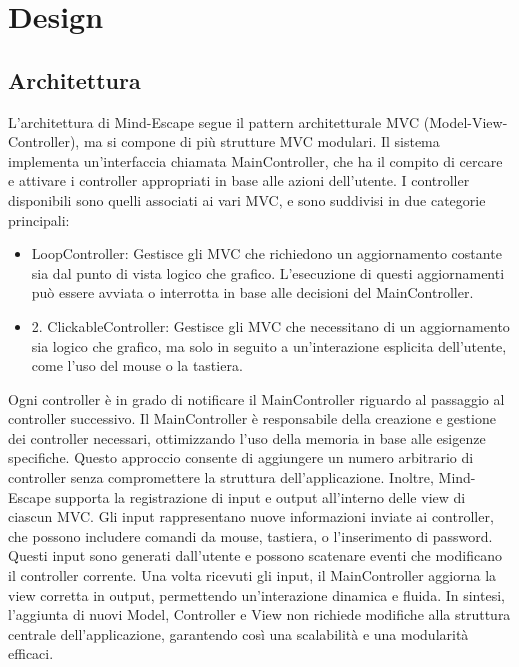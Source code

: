 \documentclass[a4paper,12pt]{report}
\begin{document}
\chapter{Design}
\section{Architettura}
L'architettura di Mind-Escape segue il pattern architetturale MVC (Model-View-Controller), ma si compone di più strutture MVC modulari. 
Il sistema implementa un'interfaccia chiamata MainController, che ha il compito di cercare e attivare i controller appropriati in base alle azioni dell'utente. 
I controller disponibili sono quelli associati ai vari MVC, e sono suddivisi in due categorie principali:
\begin{itemize}
	\item LoopController: Gestisce gli MVC che richiedono un aggiornamento costante sia dal punto di vista logico che grafico. L'esecuzione di questi aggiornamenti può essere avviata o interrotta in base alle decisioni del MainController.
	\item 2.	ClickableController: Gestisce gli MVC che necessitano di un aggiornamento sia logico che grafico, ma solo in seguito a un'interazione esplicita dell'utente, come l'uso del mouse o la tastiera.
\end{itemize}
%
Ogni controller è in grado di notificare il MainController riguardo al passaggio al controller successivo. Il MainController è responsabile della creazione e gestione dei controller necessari, ottimizzando l'uso della memoria in base alle esigenze specifiche. 
Questo approccio consente di aggiungere un numero arbitrario di controller senza compromettere la struttura dell'applicazione.
%
Inoltre, Mind-Escape supporta la registrazione di input e output all'interno delle view di ciascun MVC.
Gli input rappresentano nuove informazioni inviate ai controller, che possono includere comandi da mouse, tastiera, o l'inserimento di password. 
Questi input sono generati dall'utente e possono scatenare eventi che modificano il controller corrente. Una volta ricevuti gli input, il MainController aggiorna la view corretta in output, permettendo un'interazione dinamica e fluida.
%
In sintesi, l'aggiunta di nuovi Model, Controller e View non richiede modifiche alla struttura centrale dell'applicazione, garantendo così una scalabilità e una modularità efficaci.
%
\end{document}
